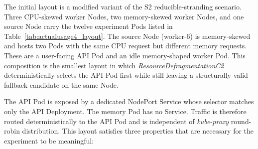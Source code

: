The initial layout is a modified variant of the S2 reducible-stranding scenario. Three CPU-skewed worker Nodes, two memory-skewed worker Nodes, and one source Node carry the twelve experiment Pods listed in Table~\ref{tab:actualusage4_layout}. The source Node (worker-6) is memory-skewed and hosts two Pods with the same CPU request but different memory requests. These are a user-facing API Pod and an idle memory-shaped worker Pod. This composition is the smallest layout in which \textit{ResourceDefragmentationC2} deterministically selects the API Pod first while still leaving a structurally valid fallback candidate on the same Node.

\begin{table}[tbp]
    \centering
    \caption{Initial Pod Placement for the Actual Usage Eviction Test}
    \label{tab:actualusage4_layout}
    \renewcommand{\arraystretch}{1.2}
\end{table}

The API Pod is exposed by a dedicated NodePort Service whose selector matches only the API Deployment. The memory Pod has no Service. Traffic is therefore routed deterministically to the API Pod and is independent of \textit{kube-proxy} round-robin distribution. This layout satisfies three properties that are necessary for the experiment to be meaningful:

